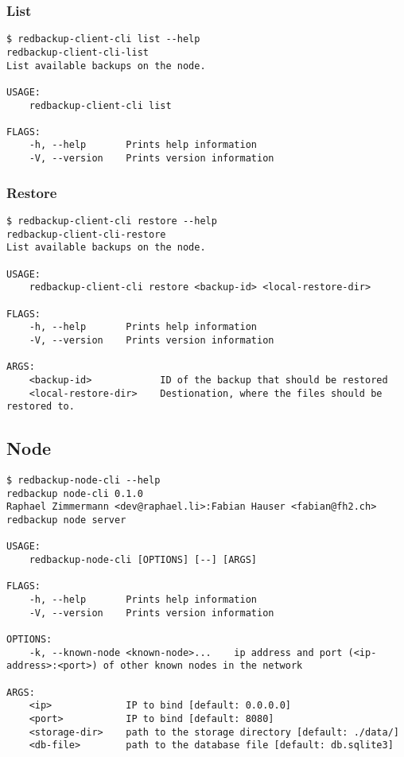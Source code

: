 \subsubsection{List}
\begin{lstlisting}
$ redbackup-client-cli list --help
redbackup-client-cli-list 
List available backups on the node.

USAGE:
    redbackup-client-cli list

FLAGS:
    -h, --help       Prints help information
    -V, --version    Prints version information
\end{lstlisting}

\subsubsection{Restore}
\begin{lstlisting}
$ redbackup-client-cli restore --help
redbackup-client-cli-restore 
List available backups on the node.

USAGE:
    redbackup-client-cli restore <backup-id> <local-restore-dir>

FLAGS:
    -h, --help       Prints help information
    -V, --version    Prints version information

ARGS:
    <backup-id>            ID of the backup that should be restored
    <local-restore-dir>    Destionation, where the files should be restored to.
\end{lstlisting}

\subsection{Node}
\begin{lstlisting}
$ redbackup-node-cli --help
redbackup node-cli 0.1.0
Raphael Zimmermann <dev@raphael.li>:Fabian Hauser <fabian@fh2.ch>
redbackup node server

USAGE:
    redbackup-node-cli [OPTIONS] [--] [ARGS]

FLAGS:
    -h, --help       Prints help information
    -V, --version    Prints version information

OPTIONS:
    -k, --known-node <known-node>...    ip address and port (<ip-address>:<port>) of other known nodes in the network

ARGS:
    <ip>             IP to bind [default: 0.0.0.0]
    <port>           IP to bind [default: 8080]
    <storage-dir>    path to the storage directory [default: ./data/]
    <db-file>        path to the database file [default: db.sqlite3]
\end{lstlisting}